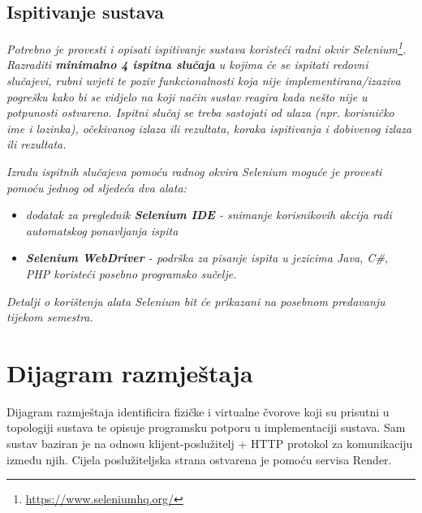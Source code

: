 			
			
			\subsection{Ispitivanje sustava}
			
			 \textit{Potrebno je provesti i opisati ispitivanje sustava koristeći radni okvir Selenium\footnote{\url{https://www.seleniumhq.org/}}. Razraditi \textbf{minimalno 4 ispitna slučaja} u kojima će se ispitati redovni slučajevi, rubni uvjeti te poziv funkcionalnosti koja nije implementirana/izaziva pogrešku kako bi se vidjelo na koji način sustav reagira kada nešto nije u potpunosti ostvareno. Ispitni slučaj se treba sastojati od ulaza (npr. korisničko ime i lozinka), očekivanog izlaza ili rezultata, koraka ispitivanja i dobivenog izlaza ili rezultata.\\ }
			 
			 \textit{Izradu ispitnih slučajeva pomoću radnog okvira Selenium moguće je provesti pomoću jednog od sljedeća dva alata:}
			 \begin{itemize}
			 	\item \textit{dodatak za preglednik \textbf{Selenium IDE} - snimanje korisnikovih akcija radi automatskog ponavljanja ispita	}
			 	\item \textit{\textbf{Selenium WebDriver} - podrška za pisanje ispita u jezicima Java, C\#, PHP koristeći posebno programsko sučelje.}
			 \end{itemize}
		 	\textit{Detalji o korištenju alata Selenium bit će prikazani na posebnom predavanju tijekom semestra.}
			
			\eject 
		
		
		\section{Dijagram razmještaja}
			
			
			 
			 Dijagram razmještaja identificira fizičke i virtualne čvorove koji su prisutni u topologiji sustava te opisuje programsku potporu u implementaciji sustava. Sam sustav baziran je na odnosu klijent-poslužitelj + HTTP protokol za komunikaciju između njih. Cijela poslužiteljska strana ostvarena je pomoću servisa Render.
			 
